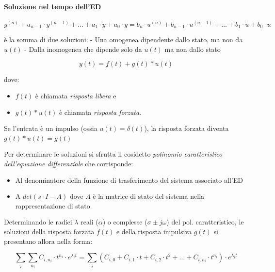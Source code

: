 \documentclass[11pt]{article}
\providecommand{\tightlist}{%
      \setlength{\itemsep}{0pt}\setlength{\parskip}{0pt}}
\begin{document}
\hypertarget{soluzione-nel-tempo-delled}{%
\paragraph{Soluzione nel tempo
dell'ED}\label{soluzione-nel-tempo-delled}}

\begin{equation}
    y^{(n)} + a_{n-1} \cdot y^{(n-1)} + \dots + a_1 \cdot \dot{y} + a_0 \cdot y = b_n \cdot u^{(n)} + b_{n-1} \cdot u^{(n-1)} + \dots + b_1 \cdot \dot{u} + b_0 \cdot u
\end{equation}

è la somma di due soluzioni: - Una omogenea dipendente dallo stato, ma
non da \(u(t)\) - Dalla inomogenea che dipende solo da \(u(t)\) ma non
dallo stato

\begin{equation}
y(t) = f(t) + g(t) * u(t)
\end{equation}

dove:

\begin{itemize}
\tightlist
\item
  \(f(t)\) è chiamata \emph{risposta libera} e
\item
  \(g(t) * u(t)\) è chiamata \emph{risposta forzata}.
\end{itemize}

Se l'entrata è un impulso (ossia \(u(t) = \delta(t)\)), la risposta
forzata diventa \(g(t) * u(t) = g(t)\)

    Per determinare le soluzioni si sfrutta il cosidetto \emph{polinomio
caratteristico dell'equazione differenziale} che corrisponde:

\begin{itemize}
\tightlist
\item
  Al denominatore della funzione di trasferimento del sistema associato
  all'ED
\item
  A \(det(s \cdot I - A)\) dove \(A\) è la matrice di stato del sistema
  nella rappresentazione di stato
\end{itemize}

    Determinando le radici \(\lambda\) reali (\(\alpha\)) o complesse
(\(\sigma \pm j\omega\)) del pol. caratteristico, le soluzioni della
risposta forzata \(f(t)\) e della risposta impulsiva \(g(t)\) si
presentano allora nella forma:

\begin{equation}
\sum_i \sum_{n_i} C_{i, n_i} \cdot t^{n_i} \cdot e^{\lambda_i t} = \sum_i ( C_{i,0} + C_{i,1} \cdot t + C_{i,2} \cdot t^2 + \dots + C_{i,n_i} \cdot t^{n_i}) \cdot e^{\lambda_i t}
\end{equation}
\end{document}
